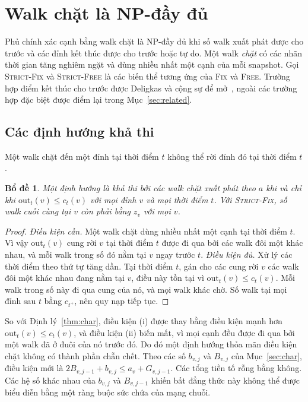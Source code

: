 \documentclass[pdflatex,sn-mathphys-num]{sn-jnl}
\theoremstyle{thmstyleone}%
\newtheorem{lemma}[theorem]{Bổ đề}%
\theoremstyle{thmstyletwo}%
\theoremstyle{thmstylethree}%
\newcommand{\out}{\mathrm{out}}
\newcommand{\FIX}{\textup{\textsc{Fix}}}
\newcommand{\FREE}{\textup{\textsc{Free}}}
\newcommand{\SFIX}{\textup{\textsc{Strict-Fix}}}
\newcommand{\SFREE}{\textup{\textsc{Strict-Free}}}
\begin{document}
\section{Walk chặt là NP-đầy đủ}\label{sec:strict}

Phủ chính xác cạnh bằng walk chặt là NP-đầy đủ khi số walk xuất phát được cho trước và các đỉnh kết thúc được cho trước hoặc tự do. Một walk \emph{chặt} có các nhãn thời gian tăng nghiêm ngặt và dùng nhiều nhất một cạnh của mỗi snapshot. Gọi \SFIX{} và \SFREE{} là các biến thể tương ứng của \FIX{} và \FREE{}. Trường hợp điểm kết thúc cho trước được Deligkas và cộng sự để mở~\cite[tr.~26504]{deligkas2025}, ngoài các trường hợp đặc biệt được điểm lại trong Mục~\ref{sec:related}.

\subsection{Các định hướng khả thi}

Một walk chặt đến một đỉnh tại thời điểm $t$ không thể rời đỉnh đó tại thời điểm $t$.

\begin{lemma}\label{lem:strict}
Một định hướng là khả thi bởi các walk chặt xuất phát theo $a$ khi và chỉ khi $\out_t(v)\le c_t(v)$ với mọi đỉnh $v$ và mọi thời điểm $t$. Với \SFIX{}, số walk cuối cùng tại $v$ còn phải bằng $z_v$ với mọi $v$.
\end{lemma}

\begin{proof}
\emph{Điều kiện cần.} Một walk chặt dùng nhiều nhất một cạnh tại thời điểm $t$. Vì vậy $\out_t(v)$ cung rời $v$ tại thời điểm $t$ được đi qua bởi các walk đôi một khác nhau, và mỗi walk trong số đó nằm tại $v$ ngay trước $t$. \emph{Điều kiện đủ.} Xử lý các thời điểm theo thứ tự tăng dần. Tại thời điểm $t$, gán cho các cung rời $v$ các walk đôi một khác nhau đang nằm tại $v$, điều này tồn tại vì $\out_t(v)\le c_t(v)$. Mỗi walk trong số này đi qua cung của nó, và mọi walk khác chờ. Số walk tại mọi đỉnh sau $t$ bằng $c_{t^+}$, nên quy nạp tiếp tục.
\end{proof}

So với Định lý~\ref{thm:char}, điều kiện (i) được thay bằng điều kiện mạnh hơn $\out_t(v)\le c_t(v)$, và điều kiện (ii) biến mất, vì mọi cạnh đều được đi qua bởi một walk đã ở đuôi của nó trước đó. Do đó một định hướng thỏa mãn điều kiện chặt không có thành phần chẵn chết. Theo các số $b_{v,j}$ và $B_{v,j}$ của Mục~\ref{sec:char}, điều kiện mới là $2B_{v,j-1}+b_{v,j}\le a_v+G_{v,j-1}$. Các tổng tiền tố rỗng bằng không. Các hệ số khác nhau của $b_{v,j}$ và $B_{v,j-1}$ khiến bất đẳng thức này không thể được biểu diễn bằng một ràng buộc sức chứa của mạng chuỗi.
\end{document}
